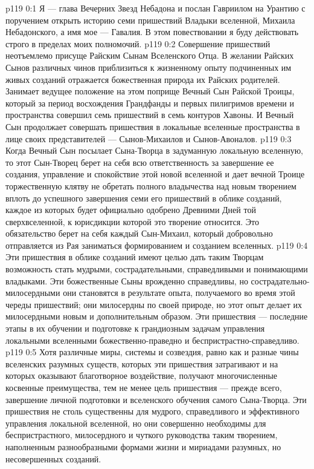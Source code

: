 \author{Глава Вечерних Звезд}
\vs p119 0:1 Я --- глава Вечерних Звезд Небадона и послан Гавриилом на Урантию с поручением открыть историю семи пришествий Владыки вселенной, Михаила Небадонского, а имя мое --- Гавалия. В этом повествовании я буду действовать строго в пределах моих полномочий.
\vs p119 0:2 \pc Совершение пришествий неотъемлемо присуще Райским Сынам Вселенского Отца. В желании Райских Сынов различных чинов приблизиться к жизненному опыту подчиненных им живых созданий отражается божественная природа их Райских родителей. Занимает ведущее положение на этом поприще Вечный Сын Райской Троицы, который за период восхождения Грандфанды и первых пилигримов времени и пространства совершил семь пришествий в семь контуров Хавоны. И Вечный Сын продолжает совершать пришествия в локальные вселенные пространства в лице своих представителей --- Сынов\hyp{}Михаилов и Сынов\hyp{}Авоналов.
\vs p119 0:3 Когда Вечный Сын посылает Сына\hyp{}Творца в задуманную локальную вселенную, то этот Сын\hyp{}Творец берет на себя всю ответственность за завершение ее создания, управление и спокойствие этой новой вселенной и дает вечной Троице торжественную клятву не обретать полного владычества над новым творением вплоть до успешного завершения семи его пришествий в облике созданий, каждое из которых будет официально одобрено Древними Дней той сверхвселенной, к юрисдикции которой это творение относится. Это обязательство берет на себя каждый Сын\hyp{}Михаил, который добровольно отправляется из Рая заниматься формированием и созданием вселенных.
\vs p119 0:4 Эти пришествия в облике созданий имеют целью дать таким Творцам возможность стать мудрыми, сострадательными, справедливыми и понимающими владыками. Эти божественные Сыны врожденно справедливы, но сострадательно\hyp{}милосердными они становятся в результате опыта, получаемого во время этой череды пришествий; они милосердны по своей природе, но этот опыт делает их милосердными новым и дополнительным образом. Эти пришествия --- последние этапы в их обучении и подготовке к грандиозным задачам управления локальными вселенными божественно\hyp{}праведно и беспристрастно\hyp{}справедливо.
\vs p119 0:5 Хотя различные миры, системы и созвездия, равно как и разные чины вселенских разумных существ, которых эти пришествия затрагивают и на которых оказывают благотворное воздействие, получают многочисленные косвенные преимущества, тем не менее цель пришествия --- прежде всего, завершение личной подготовки и вселенского обучения самого Сына\hyp{}Творца. Эти пришествия не столь существенны для мудрого, справедливого и эффективного управления локальной вселенной, но они совершенно необходимы для беспристрастного, милосердного и чуткого руководства таким творением, наполненным разнообразными формами жизни и мириадами разумных, но несовершенных созданий.
